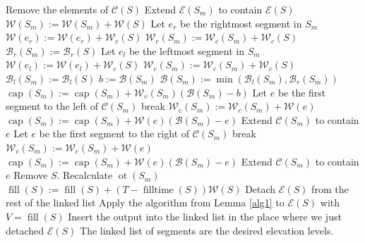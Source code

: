 \documentclass[11pt,a4paper]{article}
\DeclareMathOperator{\capp}{cap}
\DeclareMathOperator{\ot}{ot}
\DeclareMathOperator{\Fill}{fill}
\DeclareMathOperator{\filltime}{filltime}
\begin{document}
\begin{algorithmic}[1]
            \State Remove the elements of $\mathcal{C}(S)$ \label{a2:remcs}
            \State Extend $\mathcal{E}(S_m)$ to contain $\mathcal{E}(S)$ \label{a2:extend}
            \State $\mathcal{W}(S_m) := \mathcal{W}(S_m) + \mathcal{W}(S)$ \label{a2:addwsm}
              \State Let $e_r$ be the rightmost segment in $S_m$ \label{a2:geter2}
              \State $\mathcal{W}(e_r) := \mathcal{W}(e_r) + \mathcal{W}_c(S)$ \label{a2:addwer}
                \State $\mathcal{W}_c(S_m) := \mathcal{W}_c(S_m) + \mathcal{W}_c(S)$
              \EndIf
              \State $\mathcal{B}_r(S_m) := \mathcal{B}_r(S)$ \label{a2:bru}
            \Else
              \State Let $e_l$ be the leftmost segment in $S_m$
              \State $\mathcal{W}(e_l) := \mathcal{W}(e_l) + \mathcal{W}_c(S)$
                \State $\mathcal{W}_c(S_m) := \mathcal{W}_c(S_m) + \mathcal{W}_c(S)$
              \EndIf
              \State $\mathcal{B}_l(S_m) := \mathcal{B}_l(S)$ \label{a2:blu}
            \EndIf
            \State $b := \mathcal{B}(S_m)$
            \State $\mathcal{B}(S_m) := \min(\mathcal{B}_l(S_m), \mathcal{B}_r(S_m))$ \label{a2:bu}
            \State $\capp(S_m) := \capp(S_m) + \mathcal{W}_c(S_m)(\mathcal{B}(S_m) - b)$ \label{a2:inccap}
             \label{a2:walkstart}
              \State Let $e$ be the first segment to the left of $\mathcal{C}(S_m)$
                  \State break
              \EndIf
              \State $\mathcal{W}_c(S_m) := \mathcal{W}_c(S_m) + \mathcal{W}(e)$
              \State $\capp(S_m) := \capp(S_m) + \mathcal{W}(e)(\mathcal{B}(S_m) - e)$
              \State Extend $\mathcal{C}(S_m)$ to contain $e$ \label{a2:cext1} \label{a2:dec1}
            \EndWhile
              \State Let $e$ be the first segment to the right of $\mathcal{C}(S_m)$
                  \State break
              \EndIf
              \State $\mathcal{W}_c(S_m) := \mathcal{W}_c(S_m) + \mathcal{W}(e)$
              \State $\capp(S_m) := \capp(S_m) + \mathcal{W}(e)(\mathcal{B}(S_m) - e)$
              \State Extend $\mathcal{C}(S_m)$ to contain $e$ \label{a2:cext2} \label{a2:dec2}
            \EndWhile  \label{a2:walkstop}
            \State Remove $S$. \label{a2:rems2}
            \State Recalculate $\ot(S_m)$ \label{a2:recalotsm}
        \EndIf
    \EndWhile
      \State $\Fill(S) := \Fill(S) + (T - \filltime(S))\mathcal{W}(S)$ \label{a2:lastfill}
      \State Detach $\mathcal{E}(S)$ from the rest of the linked list
      \State Apply the algorithm from Lemma \ref{alg1} to $\mathcal{E}(S)$ with $V = \Fill(S)$
      \State Insert the output into the linked list in the place where we just detached $\mathcal{E}(S)$
    \EndFor
    \State The linked list of segments are the desired elevation levels.
\end{algorithmic}
\end{document}
